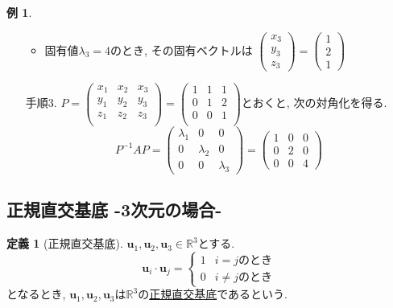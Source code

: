 \documentclass[dvipdfmx,a4paper,11pt]{article}
\newcommand{\R}{\mathbb{R}}
\theoremstyle{definition}
\newtheorem{dfn}[thm]{定義}
\newtheorem{exa}[thm]{例}
\begin{document}
\begin{exa}
\begin{enumerate}
\begin{itemize}
  \item 固有値$\lambda_3=4$のとき, その固有ベクトルは
 $ \begin{pmatrix}
x_3\\  y_3\\ z_3
 \end{pmatrix}  
 =
  \begin{pmatrix}
1\\  2\\1
 \end{pmatrix}  
 $
 \end{itemize}
\item[手順3.]  
$P=\begin{pmatrix}
x_1&x_2&x_3\\  
y_1&y_2&y_3\\ 
z_1&z_2&z_3\\
\end{pmatrix}
=
\begin{pmatrix}
1& 1&1 \\
0&1&2 \\
0&0& 1 \\
\end{pmatrix}
$とおくと, 次の対角化を得る.
$$
P^{-1} A P=
\begin{pmatrix}
\lambda_1& 0 &0\\
0& \lambda_2 &0\\
0 & 0& \lambda_3
\end{pmatrix}
=
\begin{pmatrix}
1& 0 &0\\
0& 2 &0\\
0 & 0& 4
\end{pmatrix}
$$ 
\end{enumerate}
\end{exa}



 \subsection{正規直交基底 -3次元の場合-}
 
   \begin{tcolorbox}[
    colback = white,
    colframe = green!35!black,
    fonttitle = \bfseries,
    breakable = true]
    \begin{dfn}[正規直交基底]
$\bm{u}_1, \bm{u}_2, \bm{u}_3\in \R^3$とする. 
$$
\bm{u}_i\cdot \bm{u}_j =
\left\{
\begin{array}{ll}
1 & \text{$i=j$のとき} \\
0 & \text{$i\neq j$のとき}
\end{array}
\right.
$$
となるとき, $\bm{u}_1, \bm{u}_2, \bm{u}_3$は$\R^3$の\underline{正規直交基底}であるという. 
  \end{dfn}
 \end{tcolorbox}
\end{document}
